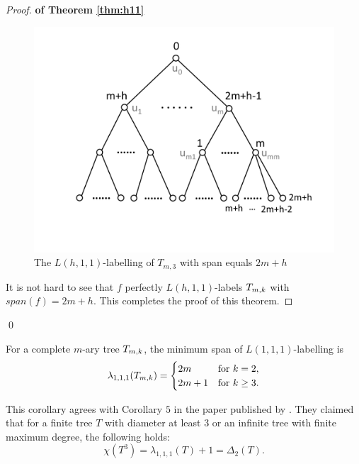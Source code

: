 \begin{proof}{\bf of Theorem \ref{thm:h11}}
\begin{figure}
\centering
      \vspace{-10pt}
    \includegraphics[scale=0.4]{../figures/fig3-3.pdf}
        \vspace{-30pt}
\caption{The $L(h,1,1)$-labelling of $T_{m,3}$ with span equals $2m+h$}
\label{lh11}
\end{figure}

It is not hard to see that $f$ perfectly $L(h,1,1)$-labels $T_{m,k}$ with $span(f) = 2m+h$. This completes the proof of this theorem. 
\end{proof}
\qed

\begin{corollary}
\label{thm:111} For a complete $m$-ary tree $T_{m,k}$, the minimum span of $L(1,1,1)$-labelling is 
\begin{align*}
 \lambda_{1,1,1}(T_{m,k}) =
  \begin{cases}
   2m & \text{for } k = 2, \\
   2m+1       & \text{for } k \ge 3.
  \end{cases}
\end{align*}
\end{corollary}

This corollary agrees with Corollary $5$ in the paper published by \cite{zhou10}. They claimed that for a finite tree $T$ with diameter at least $3$ or an infinite tree with finite maximum degree, the following holds: 
\[
\chi(T^3) = \lambda_{1,1,1}(T) + 1 = \Delta_2(T).
\] 

